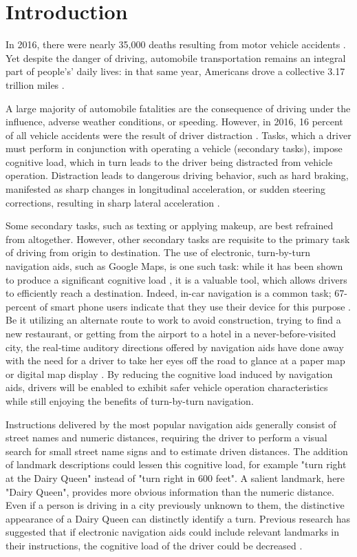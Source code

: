 \chapter{Introduction}\label{CH:introduction}
In 2016, there were nearly 35,000 deaths resulting from motor vehicle accidents \cite{crashes_48}. Yet despite the danger of driving, automobile transportation remains an integral part of people's’ daily lives: in that same year, Americans drove a collective 3.17 trillion miles \cite{crashes_48}.

A large majority of automobile fatalities are the consequence of driving under the influence, adverse weather conditions, or speeding. However, in 2016, 16 percent of all vehicle accidents were the result of driver distraction \cite{distracted_nhtsa_17}.  Tasks, which a driver must perform in conjunction with operating a vehicle (secondary tasks), impose cognitive load, which in turn leads to the driver being distracted from vehicle operation. Distraction leads to dangerous driving behavior, such as hard braking, manifested as sharp changes in longitudinal acceleration, or sudden steering corrections, resulting in sharp lateral acceleration \cite{harbluk_distraction_2002}. 

Some secondary tasks, such as texting or applying makeup, are best refrained from altogether. However, other secondary tasks are requisite to the primary task of driving from origin to destination. The use of electronic, turn-by-turn navigation aids, such as Google Maps, is one such task: while it has been shown to produce a significant cognitive load \cite{young_regan_distraction_2007}, it is a valuable tool, which allows drivers to efficiently reach a destination. Indeed, in-car navigation is a common task; 67-percent of smart phone users indicate that they use their device for this purpose \cite{pew_smartphone}. Be it utilizing an alternate route to work to avoid construction, trying to find a new restaurant, or getting from the airport to a hotel in a never-before-visited city, the real-time auditory directions offered by navigation aids have done away with the need for a driver to take her eyes off the road to glance at a paper map or digital map display \cite{walker1991vehicle}. By reducing the cognitive load induced by navigation aids, drivers will be enabled to exhibit safer vehicle operation characteristics while still enjoying the benefits of turn-by-turn navigation.

Instructions delivered by the most popular navigation aids generally consist of street names and numeric distances, requiring the driver to perform a visual search for small street name signs and to estimate driven distances. The addition of landmark descriptions could lessen this cognitive load, for example "turn right at the Dairy Queen" instead of "turn right in 600 feet". A salient landmark, here "Dairy Queen", provides more obvious information than the numeric distance. Even if a person is driving in a city previously unknown to them, the distinctive appearance of a Dairy Queen can distinctly identify a turn. Previous research has suggested that if electronic navigation aids could include relevant landmarks in their instructions, the cognitive load of the driver could be decreased \cite{burnett2000turn}.

